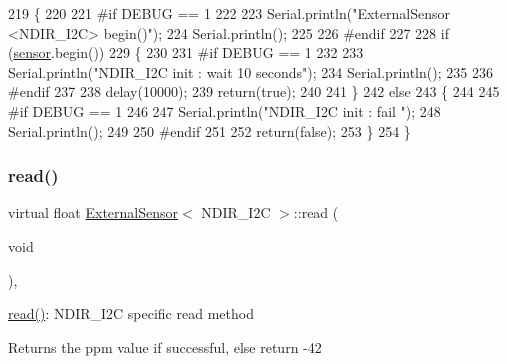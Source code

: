 \begin{DoxyCode}
219     \{
220     
221 \textcolor{preprocessor}{    #if DEBUG == 1 }
222 
223         Serial.println(\textcolor{stringliteral}{"ExternalSensor <NDIR\_I2C> begin()"});
224         Serial.println();
225     
226 \textcolor{preprocessor}{    #endif }
227 
228         \textcolor{keywordflow}{if} (\hyperlink{classExternalSensor_3_01NDIR__I2C_01_4_ae541c9cece7c38674b70114cdb74a7dc}{sensor}.begin()) 
229         \{
230         
231 \textcolor{preprocessor}{        #if DEBUG == 1 }
232             
233             Serial.println(\textcolor{stringliteral}{"NDIR\_I2C init : wait 10 seconds"});
234             Serial.println();
235         
236 \textcolor{preprocessor}{        #endif}
237 
238             delay(10000);
239             \textcolor{keywordflow}{return}(\textcolor{keyword}{true});
240 
241             \}
242         \textcolor{keywordflow}{else} 
243         \{
244         
245 \textcolor{preprocessor}{        #if DEBUG == 1 }
246 
247             Serial.println(\textcolor{stringliteral}{"NDIR\_I2C init : fail "});
248             Serial.println();
249         
250 \textcolor{preprocessor}{        #endif}
251 
252             \textcolor{keywordflow}{return}(\textcolor{keyword}{false});
253         \}   
254     \}
\end{DoxyCode}
\mbox{\label{classExternalSensor_3_01NDIR__I2C_01_4_a239d18652e9fb4673842ae9726edf44f}} 
\subsubsection{\texorpdfstring{read()}{read()}}
{\footnotesize\ttfamily virtual float \hyperlink{classExternalSensor}{External\+Sensor}$<$ N\+D\+I\+R\+\_\+\+I2C $>$\+::read (\begin{DoxyParamCaption}\item[{void}]{ }\end{DoxyParamCaption})\hspace{0.3cm}{\ttfamily [inline]}, {\ttfamily [virtual]}}

\hyperlink{classExternalSensor_3_01NDIR__I2C_01_4_a239d18652e9fb4673842ae9726edf44f}{read()}\+: N\+D\+I\+R\+\_\+\+I2C specific read method

\begin{DoxyReturn}{Returns}
the ppm value if successful, else return -\/42 
\end{DoxyReturn}


